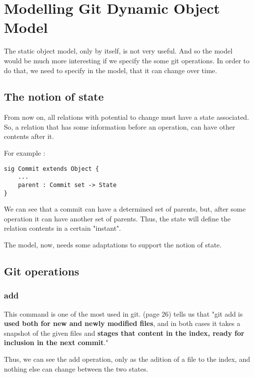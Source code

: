 \section {Modelling Git Dynamic Object Model}

The static object model, only by itself, 
is not very useful. And so
the model would be much more interesting if we specify 
the some git operations. In order to do that, we need to 
specify in the model, that it can change over time.

\subsection{The notion of state}

From now on, all relations with potential to change must
have a state associated. So, a relation
that has some information before an operation, can have
other contents after it. \par
For example :

\begin{lstlisting}
sig Commit extends Object {
	...
	parent : Commit set -> State
}
\end{lstlisting}

We can see that a commit can have a determined set of parents, but, 
after some operation it can have another set of parents. Thus, the state
will define the relation contents in a certain "instant".
\par
The model, now, needs some adaptations to support the notion of state. \par


\subsection{Git operations}

\subsubsection{add}

This command is one of the most used in git. \cite{gitComm} (page 26)
tells us that
"git add is {\bf used both for new and newly modified files},
and in both cases it takes a snapshot of the given files
and {\bf stages that content in the index, ready for inclusion
in the next commit}." \par 
Thus, we can see the add operation, only as the adition of a file 
to the index, and nothing else can change between the two states.
\par

